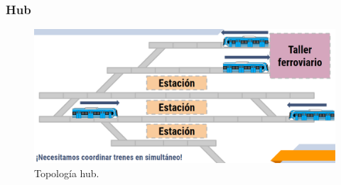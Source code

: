 \subsubsection{Hub}

\lipsum[1]

    \begin{figure}[h]
        \centering
        \includegraphics[width=1\textwidth]{Figuras/hub}
        \centering\caption{Topología hub.}
        \label{fig:hub_1}
    \end{figure}
    
\lipsum[1]